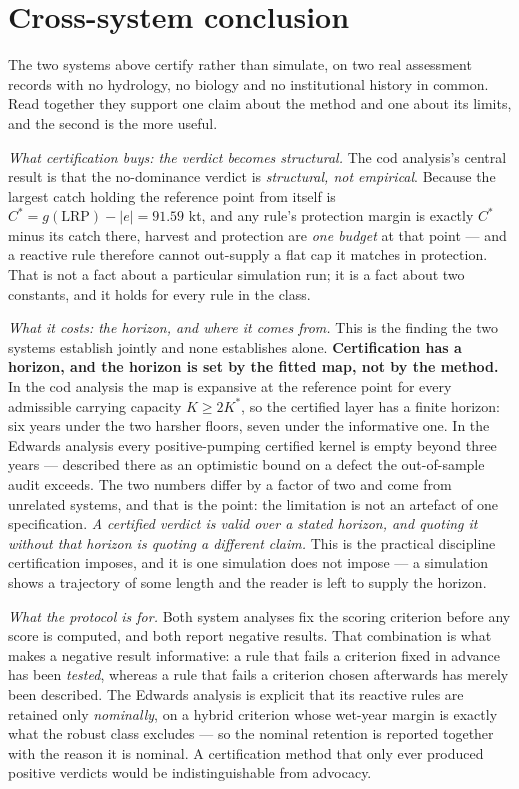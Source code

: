 \section{Cross-system conclusion}
\label{conclusion}

The two systems above certify rather than simulate, on two real assessment records with no hydrology,
no biology and no institutional history in common. Read together they support one claim about the
method and one about its limits, and the second is the more useful.

\emph{What certification buys: the verdict becomes structural.} The cod analysis's central result is that the
no-dominance verdict is \emph{structural, not empirical}. Because the largest catch holding the
reference point from itself is $C^* = g(\mathrm{LRP}) - |e| = 91.59$ kt, and any rule's protection
margin is exactly $C^*$ minus its catch there, harvest and protection are \emph{one budget} at that
point --- and a reactive rule therefore cannot out-supply a flat cap it matches in protection. That
is not a fact about a particular simulation run; it is a fact about two constants, and it holds for
every rule in the class.

\emph{What it costs: the horizon, and where it comes from.} This is the finding the two systems
establish jointly and none establishes alone. \textbf{Certification has a horizon, and the horizon
is set by the fitted map, not by the method.} In the cod analysis the map is expansive at the reference point
for every admissible carrying capacity $K \ge 2K^*$, so the certified layer has a finite horizon:
six years under the two harsher floors, seven under the informative one. In the Edwards analysis every
positive-pumping certified kernel is empty beyond three years --- described there as an optimistic
bound on a defect the out-of-sample audit exceeds. The two numbers differ by a factor of two and
come from unrelated systems, and that is the point: the limitation is not an artefact of one
specification. \emph{A certified verdict is valid over a stated horizon, and quoting it without that
horizon is quoting a different claim.} This is the practical discipline certification imposes, and
it is one simulation does not impose --- a simulation shows a trajectory of some length and the
reader is left to supply the horizon.

\emph{What the protocol is for.} Both system analyses fix the scoring criterion before any score is
computed, and both report negative results. That combination is what makes a negative result
informative: a rule that fails a criterion fixed in advance has been \emph{tested}, whereas a rule
that fails a criterion chosen afterwards has merely been described. The Edwards analysis is explicit that its
reactive rules are retained only \emph{nominally}, on a hybrid criterion whose wet-year margin is
exactly what the robust class excludes --- so the nominal retention is reported together with the
reason it is nominal. A certification method that only ever produced
positive verdicts would be indistinguishable from advocacy.

